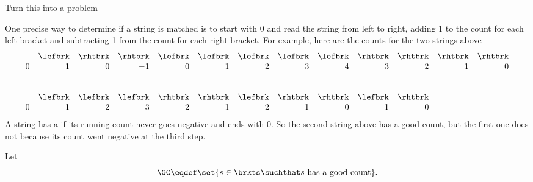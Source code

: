 \begin{editingnotes}

Turn this into a problem

One precise way to determine if a string is matched is to start with 0 and
read the string from left to right, adding 1 to the count for each left
bracket and subtracting 1 from the count for each right bracket.
For example, here are the counts for the two strings above
\[\begin{array}{rrrrrrrrrrrrr}
& \lefbrk & \rhtbrk & \rhtbrk & \lefbrk & \lefbrk & \lefbrk & \lefbrk &
\lefbrk & \rhtbrk & \rhtbrk & \rhtbrk & \rhtbrk\\
0 & 1 & 0 & -1 & 0 & 1 & 2 & 3 & 4 & 3 & 2 & 1 & 0\\
\\
\\
& \lefbrk & \lefbrk & \lefbrk & \rhtbrk & \rhtbrk & \lefbrk & \rhtbrk &
\rhtbrk & \lefbrk & \rhtbrk\\
0 & 1 & 2 & 3 & 2 & 1 & 2 & 1 & 0 & 1 & 0
\end{array}\]
A string has a  if its running count never goes
negative and ends with 0.  So the second string above has a good count, but
the first one does not because its count went negative at the third step.
\begin{definition}\label{gc-def}
Let
\[
\GC \eqdef \set{ s \in \brkts \suchthat s\ \text{has a good count}}.
\]
\end{definition}
\end{editingnotes}

\endinput
